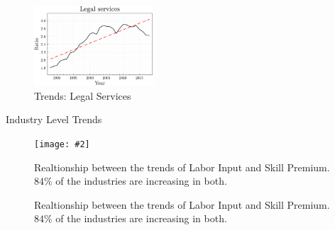 \documentclass[notes,11pt, aspectratio=169]{beamer}
\makeatletter
\newcommand{\fitimage}[2][\@nil]{
 \begin{figure}
 \begin{adjustbox}{width=0.9\textwidth, totalheight=\textheight-2\baselineskip-2\baselineskip,keepaspectratio}
 \texttt{[image: \#2]}
 \end{adjustbox}
 \def\tmp{#1}%
 \ifx\tmp\@nnil
 \else
 \caption{#1}
 \fi
 \end{figure}
}
\newenvironment{wideitemize}{\itemize\addtolength{\itemsep}{10pt}}{\enditemize}
\makeatother
\begin{document}
\begin{frame}
\begin{wideitemize}
{\begin{figure}[H]
 \includegraphics[width=0.4\textwidth]{../images/industries/skill_premium/inc5411.pdf}
 \caption{\label{fig:trends_5411} Trends: Legal Services}
 \end{figure}
 }
 \end{wideitemize}
\end{frame}

\begin{frame}{Industry Level Trends \hyperlink{sp-model-decomposition}{}}\label{frame-industry-trends}

 \fitimage[Realtionship between the trends of Labor Input and Skill Premium. $84\%$ of the industries are increasing in both. ]{../images/trend_correlation_slides.pdf}

\end{frame}
\end{document}
